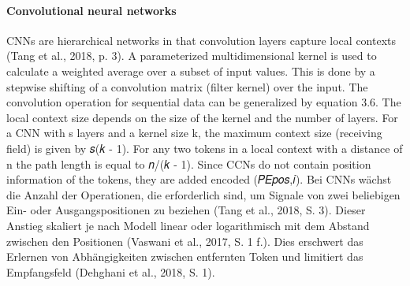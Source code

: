 \bigskip

\paragraph{Convolutional neural networks}

CNNs are hierarchical networks in that convolution layers capture local contexts (Tang et al., 2018, p. 3). A parameterized multidimensional kernel is used to calculate a weighted average over a subset of input values. This is done by a stepwise shifting of a convolution matrix (filter kernel) over the input. The convolution operation for sequential data can be generalized by equation 3.6. The local context size depends on the size of the kernel and the number of layers. For a CNN with s layers and a kernel size k, the maximum context size (receiving field) is given by 𝑠(𝑘 - 1). For any two tokens in a local context with a distance of n the path length is equal to 𝑛/(𝑘 - 1). Since CCNs do not contain position information of the tokens, they are added encoded (𝑃𝐸𝑝𝑜𝑠,𝑖).
Bei CNNs wächst die Anzahl der Operationen, die erforderlich sind, um Signale von zwei beliebigen Ein- oder Ausgangspositionen zu beziehen (Tang et al., 2018, S. 3). Dieser Anstieg skaliert je nach Modell linear oder logarithmisch mit dem Abstand zwischen den Positionen (Vaswani et al., 2017, S. 1 f.). Dies erschwert das Erlernen von Abhängigkeiten zwischen entfernten Token und limitiert das Empfangsfeld (Dehghani et al., 2018, S. 1).